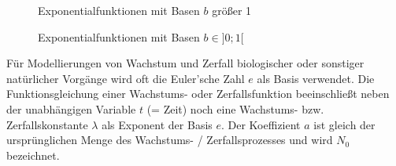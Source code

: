 \pagebreak

\begin{figure}[t!]
	\begin{floatrow}
		\ffigbox
		{
		} {\caption*{Exponentialfunktionen mit Basen $b$ gr\"{o}\ss{}er 1}}

		\ffigbox
		{
		} {\caption*{Exponentialfunktionen mit Basen $b \in ]0; 1[$}}
	\end{floatrow}
\end{figure}

\pagebreak

F\"{u}r Modellierungen von Wachstum und Zerfall biologischer oder sonstiger nat\"{u}rlicher Vorg\"{a}nge wird oft die Euler'sche Zahl $e$ als Basis verwendet. Die Funktionsgleichung einer Wachstums- oder Zerfallsfunktion beeinschlie\ss{}t neben der unabh\"{a}ngigen Variable $t$ (= Zeit) noch eine Wachstums- bzw. Zerfallskonstante $\lambda$ als Exponent der Basis $e$. Der Koeffizient $a$ ist gleich der urspr\"{u}nglichen Menge des Wachstums- / Zerfallsprozesses und wird $N_{0}$ bezeichnet. 

